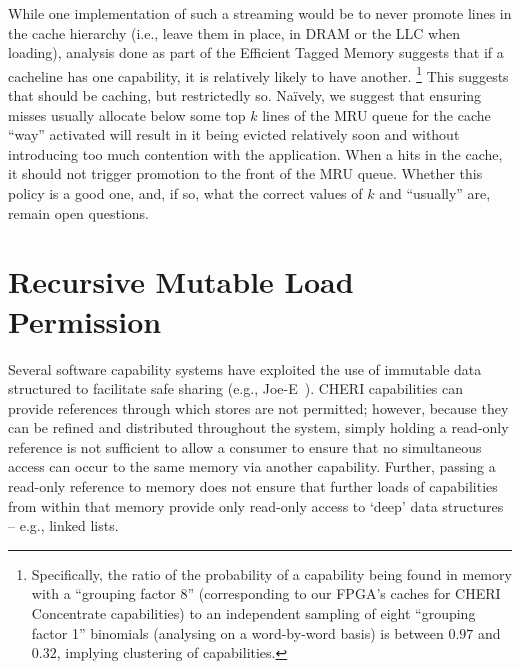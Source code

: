 While one implementation of such a streaming  would be to never promote
lines in the cache hierarchy (i.e., leave them in place, in DRAM or the LLC
when loading), analysis done as part of the Efficient Tagged Memory \cite[\S
VI.B]{joannou2017:tagged-memory} suggests that if a cacheline has one
capability, it is relatively likely to have another.%
%
\footnote{Specifically, the ratio of the probability of a capability being
found in memory with a ``grouping factor 8'' (corresponding to our FPGA's
caches for CHERI Concentrate capabilities) to an independent sampling of
eight ``grouping factor 1'' binomials (analysing on a word-by-word basis) is
between $0.97$ and $0.32$, implying clustering of capabilities.}
%
This suggests that  should be caching, but restrictedly
so.  Na\"ively, we suggest that ensuring misses usually allocate below some
top $k$ lines of the MRU queue for the cache ``way'' activated will result
in it being evicted relatively soon and without introducing too much
contention with the application.  When a  hits in the
cache, it should not trigger promotion to the front of the MRU queue.
Whether this policy is a good one, and, if so, what the correct values of
$k$ and ``usually'' are, remain open questions.



\section{Recursive Mutable Load Permission} %
\label{app:exp:recmutload}


Several software capability systems have exploited the use of immutable data
structured to facilitate safe sharing (e.g., Joe-E~\cite{mettler:joee}).
CHERI capabilities can provide references through which stores are not
permitted; however, because they can be refined and distributed throughout the
system, simply holding a read-only reference is not sufficient to allow a
consumer to ensure that no simultaneous access can occur to the same memory
via another capability.
Further, passing a read-only reference to memory does not ensure that further
loads of capabilities from within that memory provide only read-only access to
`deep' data structures -- e.g., linked lists.

